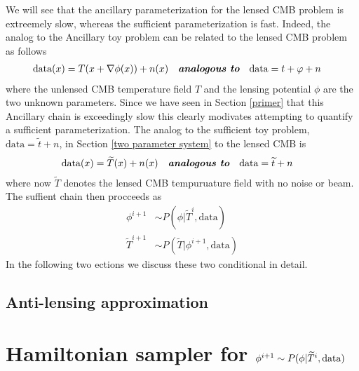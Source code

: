 \documentclass[noinfoline]{imsart}
\begin{document}
We will see that the ancillary parameterization for the lensed CMB problem is extreemely slow, whereas the sufficient parameterization is fast. Indeed, the analog to the Ancillary toy problem can be related to the lensed CMB problem as follows
\begin{align*}
  \text{data}(x) &= T(x+\nabla \phi(x)) + n(x)\quad\text{\bf\em analogous to}\quad
  \text{data} =  t +\varphi + n
\end{align*}
where the unlensed  CMB temperature field $T$ and the lensing potential $\phi$ are the two unknown parameters. Since we have seen in Section \ref{primer} that this Ancillary chain is exceedingly slow this clearly modivates attempting to quantify a sufficient parameterization. The analog to the sufficient toy problem, $\text{data} = \widetilde t + n$,  in Section \ref{two parameter system} to the lensed CMB is 
\begin{align*}
  \text{data}(x) &= \widetilde T(x) + n(x) \quad\text{\bf\em analogous to}\quad
  \text{data} =  \widetilde t + n
\end{align*}
where now $\widetilde T$ denotes the lensed CMB tempuruature field with no noise or beam.
The suffient chain then procceeds as
\begin{align}
\phi^{i+1}&\sim P(\phi | \widetilde T^{i},  \text{data})\\
\widetilde T^{i+1}&\sim P(\widetilde T |  \phi^{i+1},\text{data})
\end{align}
In the following two ections we discuss these two conditional in detail.



\subsection{Anti-lensing approximation}


\section{Hamiltonian sampler for $\phi^{i+1}\sim P(\phi | \widetilde T^{i},  \text{\rm data})$}
\end{document}
